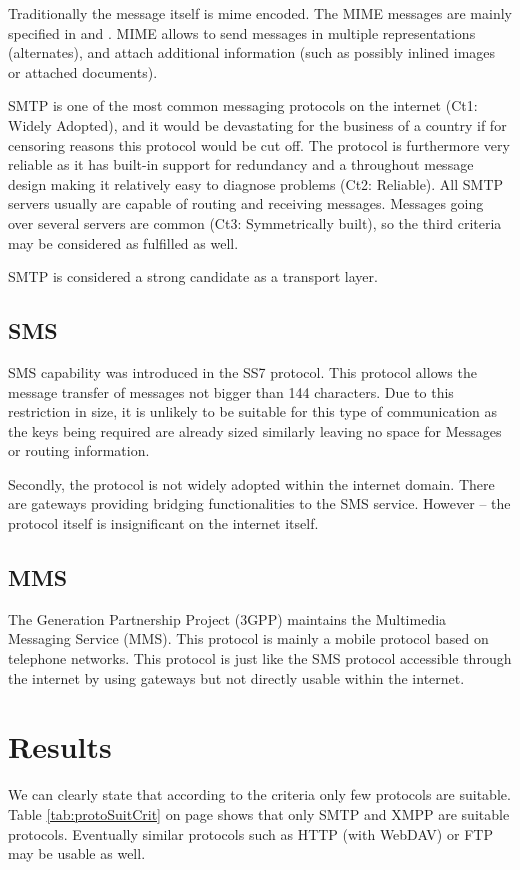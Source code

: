 \documentclass[a4paper,appendixprefix,pdfusetitle,twocolumn,fontsize=8pt,draft,DIV=calc]{scrbook}
\begin{document}
Traditionally the message itself is mime encoded. The MIME messages are mainly specified in \cite{RFC2045} and \cite{RFC2046}. MIME allows to send messages in multiple representations (alternates), and attach additional information (such as possibly inlined images or attached documents). 

SMTP is one of the most common messaging protocols on the internet (Ct1: Widely Adopted), and it would be devastating for the business of a country if for censoring reasons this protocol would be cut off. The protocol is furthermore very reliable as it has built-in support for redundancy and a throughout message design making it relatively easy to diagnose problems (Ct2: Reliable). All SMTP servers usually are capable of routing and receiving messages. Messages going over several servers are common (Ct3: Symmetrically built), so the third criteria may be considered as fulfilled as well.

SMTP is considered a strong candidate as a transport layer.  

\subsection{SMS}
SMS capability was introduced in the SS7 protocol. This protocol allows the message transfer of messages not bigger than 144 characters. Due to this restriction in size, it is unlikely to be suitable for this type of communication as the keys being required are already sized similarly leaving no space for Messages or routing information.

Secondly, the protocol is not widely adopted within the internet domain. There are gateways providing bridging functionalities to the SMS service. However -- the protocol itself is insignificant on the internet itself. 

\subsection{MMS}
The  Generation Partnership Project (3GPP) maintains the Multimedia Messaging Service (MMS). This protocol is mainly a mobile protocol based on telephone networks. This protocol is just like the SMS protocol accessible through the internet by using gateways but not directly usable within the internet.

\section{Results}
We can clearly state that according to the criteria only few protocols are suitable. Table \ref{tab:protoSuitCrit} on page \pageref{tab:protoSuitCrit} shows that only SMTP and XMPP are suitable protocols. Eventually similar protocols such as HTTP (with WebDAV) or FTP may be usable as well. 
\end{document}

